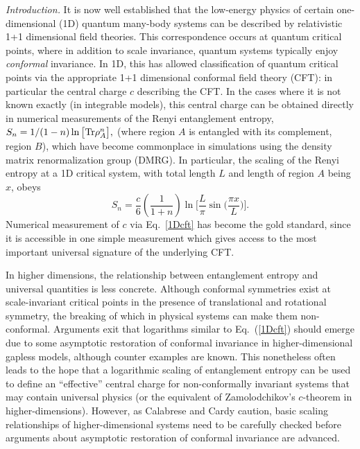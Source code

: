 \documentclass[prl,aps,twocolumn,floatfix,amsmath,amssymb,superscriptaddress,tightenlines]{revtex4}
\begin{document}
{\it Introduction.} It is now well established that the low-energy physics of certain one-dimensional (1D) quantum many-body systems can be described by relativistic 1+1 dimensional field theories.  This correspondence occurs at quantum critical points, where in addition to scale invariance, quantum systems typically enjoy {\it conformal} invariance.  In 1D, this has allowed classification of quantum critical points via the appropriate 1+1 dimensional conformal field theory (CFT): in particular the central charge $c$ describing the CFT.
In the cases where it is not known exactly (in integrable models), 
this central charge can be obtained directly in numerical measurements of the Renyi entanglement entropy,
$
S_n = 1/(1-n) \ln \big[ {\rm Tr} \rho_A^n \big],
$
(where region $A$ is entangled with its complement, region $B$), which have become commonplace in simulations using the density matrix renormalization group (DMRG).  In particular, the
scaling of the Renyi entropy at a 1D critical system, with total length $L$ and length of region $A$ being $x$, obeys
\begin{equation}
S_n = \frac{c}{6}\left({ \frac{1}{1+n} }\right) \ln\Big[ \frac{L}{\pi} \sin\big( \frac{\pi x}{L} \big) \Big]. \label{1Dcft}
\end{equation}
Numerical measurement of $c$ via Eq.~\ref{1Dcft} has become the gold standard, since it is accessible in one simple measurement which gives access to the most important universal signature of the underlying CFT.

In higher dimensions, the relationship between entanglement entropy and universal quantities is less concrete.  Although conformal symmetries exist at scale-invariant critical points in the presence of translational and rotational symmetry, the breaking of which in physical systems can make them non-conformal.  Arguments exit that logarithms similar to Eq.~(\ref{1Dcft}) should emerge due to some asymptotic restoration of conformal invariance in higher-dimensional gapless models, although counter examples are known.  This nonetheless often leads to the hope that a logarithmic scaling of entanglement entropy can be used to define an ``effective'' central charge for non-conformally invariant systems that may contain universal physics (or the equivalent of Zamolodchikov's $c$-theorem in higher-dimensions).
However, as Calabrese and Cardy caution, basic scaling relationships of higher-dimensional systems need to be carefully checked before
arguments about asymptotic restoration of conformal invariance are advanced.  
\end{document}
